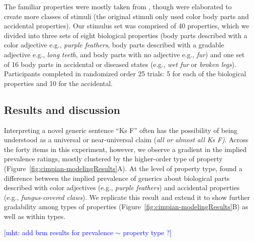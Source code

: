\documentclass[floatsintext,doc]{apa6}
\newcommand{\mht}[1]{{\textcolor{Blue}{[mht: #1]}}}
\newcommand{\ndg}[1]{{\textcolor{Green}{[ndg: #1]}}}
\begin{document}
The familiar properties were mostly taken from , though were elaborated to create more classes of stimuli (the original stimuli only used color body parts and accidental properties). 
Our stimulus set was comprised of 40 properties, which we divided into three sets of eight biological properties (body parts described with a color adjective e.g., \emph{purple feathers}, body parts described with a gradable adjective  e.g., \emph{long teeth}, and body parts with no adjective e.g., \emph{fur}) and one set of 16 body parts in accidental or diseased states (e.g., \emph{wet fur} or \emph{broken legs}).
Participants completed in randomized order 25 trials: 5 for each of the biological properties and 10 for the accidental.

\hypertarget{results-and-discussion}{%
\subsection{Results and discussion}\label{results-and-discussion}}

Interpreting a novel generic sentence \enquote{Ks F} often has the possibility of being understood as a universal or near-universal claim (\emph{all or almost all Ks F)}.
Across the forty items in this experiment, however, we observe a gradient in the implied prevalence ratings, mostly clustered by the higher-order type of property (Figure~\ref{fig:cimpian-modelingResults}A).
At the level of property type,  found a difference between the implied prevalence of generics about biological parts described with color adjectives (e.g., \emph{purple feathers}) and accidental properties (e.g., \emph{fungus-covered claws}).
We replicate this result and extend it to show further gradability among types of properties (Figure~\ref{fig:cimpian-modelingResults}B) as well as within types.

\mht{add brm results for prevalence $\sim$ property type ?}
\end{document}
